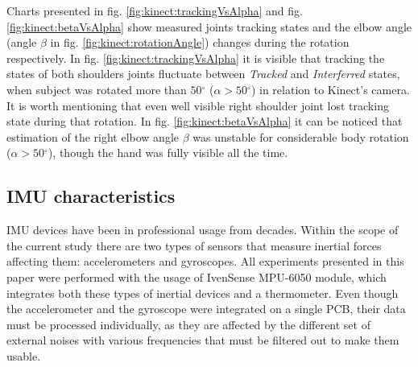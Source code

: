 \documentclass[sensors,article,submit,moreauthors,pdftex,10pt,a4paper]{mdpi}
\newcommand{\degree}{\ensuremath{{}^{\circ}}\xspace}
\begin{document}
	Charts presented in fig. \ref{fig:kinect:trackingVsAlpha} and fig. \ref{fig:kinect:betaVsAlpha} show measured joints tracking states and the elbow angle (angle $\beta$ in fig. \ref{fig:kinect:rotationAngle}) changes during the rotation respectively. In fig. \ref{fig:kinect:trackingVsAlpha} it is visible that tracking the states of both shoulders joints fluctuate between \emph{Tracked} and \emph{Interferred} states, when subject was rotated more than $50\degree$ ($\alpha > 50\degree$) in relation to Kinect’s camera. It is worth mentioning that even well visible right shoulder joint lost tracking state during that rotation. In fig. \ref{fig:kinect:betaVsAlpha} it can be noticed that estimation of the right elbow angle $\beta$ was unstable for considerable body rotation ($\alpha > 50\degree$), though the hand was fully visible all the time.
	
	\subsection{IMU characteristics}
	IMU devices have been in professional usage from decades. Within the scope of the current study there are two types of sensors that measure inertial forces affecting them: accelerometers and gyroscopes. All experiments presented in this paper were performed with the usage of IvenSense MPU-6050 module, which integrates both these types of inertial devices and a thermometer. Even though the accelerometer and the gyroscope were integrated on a single PCB, their data must be processed individually, as they are affected by the different set of external noises with various frequencies that must be filtered out to make them usable.
	
\end{document}
